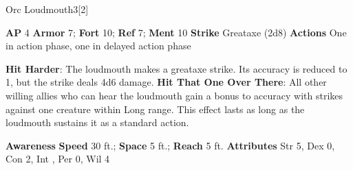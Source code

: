 \begin{monsection}{Orc Loudmouth}{3}[2]
\vspace{-1em}\vspace{-1em}
\begin{spellcontent}
\begin{spelltargetinginfo}
{\textbf{AP} 4}
\pari \textbf{Armor} 7;
\textbf{Fort} 10;
\textbf{Ref} 7;
\textbf{Ment} 10
\pari \textbf{Strike} Greataxe  (2d8)
\pari \textbf{Actions} One in action phase, one in delayed action phase
\end{spelltargetinginfo}
\begin{spelleffects}
\pari
\textbf{Hit Harder}:
The loudmouth makes a greataxe strike.
Its accuracy is reduced to 1, but the strike deals 4d6 damage.
\vspace{0.5em}
\pari
\textbf{Hit That One Over There}:
All other willing allies who can hear the loudmouth gain a  bonus to accuracy with strikes against one creature within Long range.
This effect lasts as long as the loudmouth sustains it as a standard action.
\end{spelleffects}
\end{spellcontent}
\begin{spellsubcontent}
\begin{spellfooter}
\pari \textbf{Awareness} 
\pari \textbf{Speed} 30 ft.;
\textbf{Space} 5 ft.;
\textbf{Reach} 5 ft.
\pari \textbf{Attributes}
Str 5,
Dex 0,
Con 2,
Int ,
Per 0,
Wil 4
\end{spellfooter}
\end{spellsubcontent}
\end{monsection}
